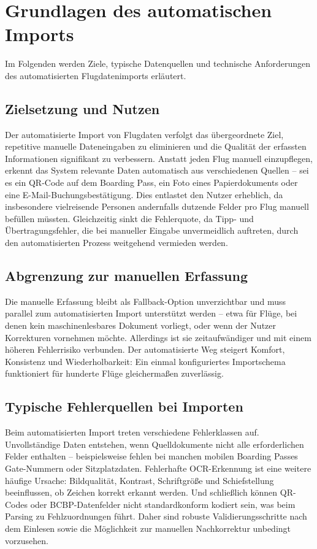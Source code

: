 \section{Grundlagen des automatischen Imports}

Im Folgenden werden Ziele, typische Datenquellen und technische Anforderungen des automatisierten Flugdatenimports erläutert.

\subsection{Zielsetzung und Nutzen}

Der automatisierte Import von Flugdaten verfolgt das übergeordnete Ziel, repetitive manuelle Dateneingaben zu eliminieren und die Qualität der erfassten Informationen signifikant zu verbessern.
Anstatt jeden Flug manuell einzupflegen, erkennt das System relevante Daten automatisch aus verschiedenen Quellen -- sei es ein QR-Code auf dem Boarding Pass, ein Foto eines Papierdokuments oder eine E-Mail-Buchungsbestätigung.
Dies entlastet den Nutzer erheblich, da insbesondere vielreisende Personen andernfalls dutzende Felder pro Flug manuell befüllen müssten.
Gleichzeitig sinkt die Fehlerquote, da Tipp- und Übertragungsfehler, die bei manueller Eingabe unvermeidlich auftreten, durch den automatisierten Prozess weitgehend vermieden werden.

\subsection{Abgrenzung zur manuellen Erfassung}

Die manuelle Erfassung bleibt als Fallback-Option unverzichtbar und muss parallel zum automatisierten Import unterstützt werden -- etwa für Flüge, bei denen kein maschinenlesbares Dokument vorliegt, oder wenn der Nutzer Korrekturen vornehmen möchte.
Allerdings ist sie zeitaufwändiger und mit einem höheren Fehlerrisiko verbunden.
Der automatisierte Weg steigert Komfort, Konsistenz und Wiederholbarkeit: Ein einmal konfiguriertes Importschema funktioniert für hunderte Flüge gleichermaßen zuverlässig.

\subsection{Typische Fehlerquellen bei Importen}

Beim automatisierten Import treten verschiedene Fehlerklassen auf.
Unvollständige Daten entstehen, wenn Quelldokumente nicht alle erforderlichen Felder enthalten -- beispielsweise fehlen bei manchen mobilen Boarding Passes Gate-Nummern oder Sitzplatzdaten.
Fehlerhafte OCR-Erkennung ist eine weitere häufige Ursache: Bildqualität, Kontrast, Schriftgröße und Schiefstellung beeinflussen, ob Zeichen korrekt erkannt werden.
Und schließlich können QR-Codes oder BCBP-Datenfelder nicht standardkonform kodiert sein, was beim Parsing zu Fehlzuordnungen führt.
Daher sind robuste Validierungsschritte nach dem Einlesen sowie die Möglichkeit zur manuellen Nachkorrektur unbedingt vorzusehen.

